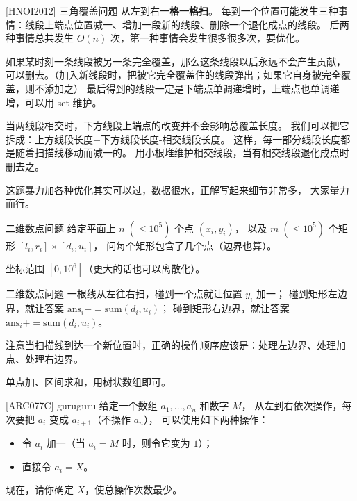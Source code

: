 \documentclass{beamer}
\begin{document}
\begin{frame}{[HNOI2012] 三角覆盖问题}
    \footnotesize
    从左到右\textbf{一格一格扫}。
    每到一个位置可能发生三种事情：线段上端点位置减一、增加一段新的线段、删除一个退化成点的线段。
    后两种事情总共发生 $O(n)$ 次，第一种事情会发生很多很多次，要优化。

    \vspace{1em}\pause
    如果某时刻一条线段被另一条完全覆盖，那么这条线段以后永远不会产生贡献，
    可以删去。（加入新线段时，把被它完全覆盖住的线段弹出；如果它自身被完全覆盖，则不添加之）
    最后得到的线段一定是下端点单调递增时，上端点也单调递增，可以用 set 维护。

    \vspace{1em}\pause
    当两线段相交时，下方线段上端点的改变并不会影响总覆盖长度。
    我们可以把它拆成：上方线段长度+下方线段长度-相交线段长度。
    这样，每一部分线段长度都是随着扫描线移动而减一的。
    用小根堆维护相交线段，当有相交线段退化成点时删去之。

    \vspace{1em}\pause
    这题暴力加各种优化其实可以过，数据很水，正解写起来细节非常多，
    大家量力而行。
\end{frame}

\begin{frame}{二维数点问题}
    \small
    给定平面上 $n\;(\leq 10^5)$ 个点 $(x_i,y_i)$，
    以及 $m\;(\leq 10^5)$ 个矩形 $[l_i,r_i]\times [d_i,u_i]$，
    问每个矩形包含了几个点（边界也算）。

    \vspace{1em}
    坐标范围 $[0,10^6]$（更大的话也可以离散化）。
\end{frame}

\begin{frame}{二维数点问题}
    \small
    一根线从左往右扫，碰到一个点就让位置 $y_i$ 加一；
    碰到矩形左边界，就让答案 $\text{ans}_i-=\text{sum}(d_i,u_i)$；
    碰到矩形右边界，就让答案 $\text{ans}_i+=\text{sum}(d_i,u_i)$。

    \vspace{1em}\pause
    注意当扫描线到达一个新位置时，正确的操作顺序应该是：处理左边界、处理加点、处理右边界。

    \vspace{1em}
    单点加、区间求和，用树状数组即可。
\end{frame}

\begin{frame}{[ARC077C] guruguru}
    \footnotesize
    给定一个数组 $a_1,...,a_n$ 和数字 $M$，
    从左到右依次操作，每次要把 $a_i$ 变成 $a_{i+1}$（不操作 $a_n$），
    可以使用如下两种操作：

    \begin{itemize}
        \item 令 $a_i$ 加一（当 $a_i=M$ 时，则令它变为 $1$）；
        \item 直接令 $a_i=X$。
    \end{itemize}

    现在，请你确定 $X$，使总操作次数最少。
\end{frame}
\end{document}
